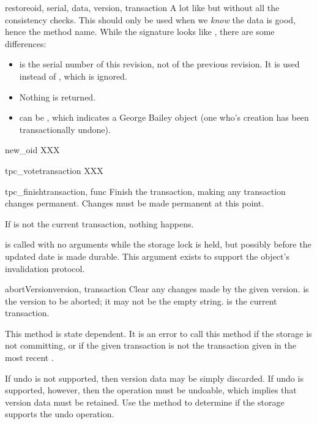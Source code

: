 \documentclass{howto}
\begin{document}
\begin{methoddesc}{restore}{oid, serial, data, version, transaction}
  A lot like  but without all the consistency checks.
  This should only be used when we \emph{know} the data is good, hence
  the method name.  While the signature looks like ,
  there are some differences:

  \begin{itemize}
        \item {} is the serial number of this revision, not
          of the previous revision.  It is used instead of
          , which is ignored.

        \item Nothing is returned.

        \item {} can be , which indicates a George
          Bailey object (one who's creation has been transactionally
          undone).
  \end{itemize}
\end{methoddesc}

\begin{methoddesc}{new_oid}{}
  XXX
\end{methoddesc}

\begin{methoddesc}{tpc_vote}{transaction}
  XXX
\end{methoddesc}

\begin{methoddesc}{tpc_finish}{transaction, func}
  Finish the transaction, making any transaction changes
  permanent.  Changes must be made permanent at this point.

  If  is not the current transaction, nothing
  happens.

   is called with no arguments while the storage lock is
  held, but possibly before the updated date is made durable.  This
  argument exists to support the  object's
  invalidation protocol.
\end{methoddesc}

\begin{methoddesc}{abortVersion}{version, transaction}
  Clear any changes made by the given version.   is the
  version to be aborted; it may not be the empty string.
   is the current transaction.

  This method is state dependent. It is an error to call this method
  if the storage is not committing, or if the given transaction is not
  the transaction given in the most recent .

  If undo is not supported, then version data may be simply
  discarded.  If undo is supported, however, then the
   operation must be undoable, which implies
  that version data must be retained.  Use the 
  method to determine if the storage supports the undo operation.
\end{methoddesc}
\end{document}
